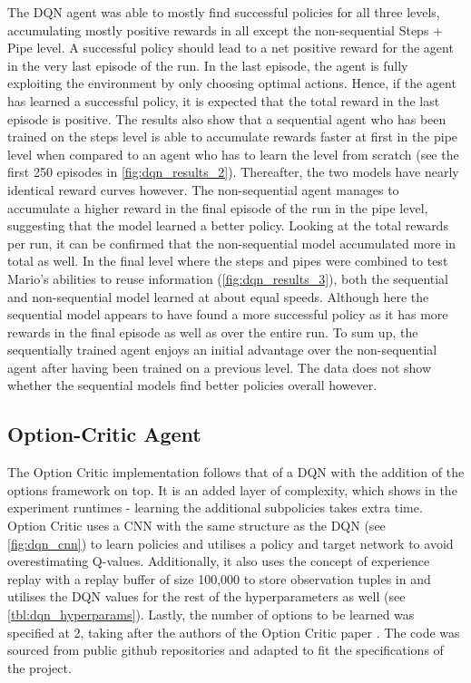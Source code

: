 \documentclass[notitlepage,a4paper,11pt]{article}
\begin{document}
The DQN agent was able to mostly find successful policies for all three levels, accumulating mostly positive rewards in all except the non-sequential Steps + Pipe level. A successful policy should lead to a net positive reward for the agent in the very last episode of the run. In the last episode, the agent is fully exploiting the environment by only choosing optimal actions. Hence, if the agent has learned a successful policy, it is expected that the total reward in the last episode is positive. The results also show that a sequential agent who has been trained on the steps level is able to accumulate rewards faster at first in the pipe level when compared to an agent who has to learn the level from scratch (see the first 250 episodes in \ref{fig:dqn_results_2}). Thereafter, the two models have nearly identical reward curves however. The non-sequential agent manages to accumulate a higher reward in the final episode of the run in the pipe level, suggesting that the model learned a better policy. Looking at the total rewards per run, it can be confirmed that the non-sequential model accumulated more in total as well. In the final level where the steps and pipes were combined to test Mario's abilities to reuse information (\ref{fig:dqn_results_3}), both the sequential and non-sequential model learned at about equal speeds. Although here the sequential model appears to have found a more successful policy as it has more rewards in the final episode as well as over the entire run. To sum up, the sequentially trained agent enjoys an initial advantage over the non-sequential agent after having been trained on a previous level. The data does not show whether the sequential models find better policies overall however.


\subsection{Option-Critic Agent}\label{oc_experiment}
The Option Critic implementation follows that of a DQN with the addition of the options framework on top. It is an added layer of complexity, which shows in the experiment runtimes - learning the additional subpolicies takes extra time. Option Critic uses a CNN with the same structure as the DQN (see \ref{fig:dqn_cnn}) to learn policies and utilises a policy and target network to avoid overestimating Q-values. Additionally, it also uses the concept of experience replay with a replay buffer of size 100,000 to store observation tuples in and utilises the DQN values for the rest of the hyperparameters as well (see \ref{tbl:dqn_hyperparams}). Lastly, the number of options to be learned was specified at 2, taking after the authors of the Option Critic paper \cite{bacon2017option}. The code was sourced from public github repositories \cite{oc_github} and adapted to fit the specifications of the project.
\end{document}
